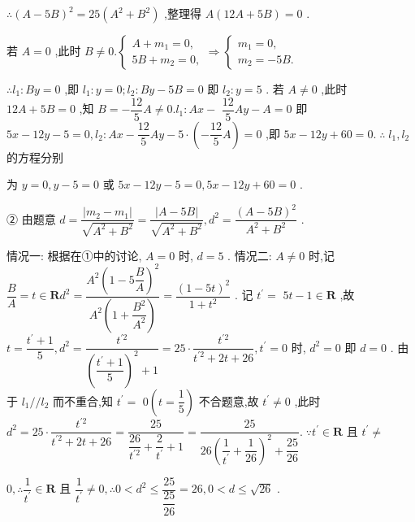 $\therefore {\left( A - 5B\right) }^{2} = {25}\left( {{A}^{2} + {B}^{2}}\right)$ ,整理得 $A\left( {{12A} + {5B}}\right)  = 0$ .

若 $A = 0$ ,此时 $B \neq  0.\left\{  {\begin{array}{l} A + {m}_{1} = 0, \\  {5B} + {m}_{2} = 0, \end{array} \Rightarrow  \left\{  \begin{array}{l} {m}_{1} = 0, \\  {m}_{2} =  - {5B}. \end{array}\right. }\right.$

$\therefore {l}_{1} : {By} = 0$ ,即 ${l}_{1} : y = 0;{l}_{2} : {By} - {5B} = 0$ 即 ${l}_{2} : y = 5$ . 若 $A \neq  0$ ,此时 ${12A} + {5B} = 0$ ,知 $B =  - \dfrac{12}{5}A \neq  0.{l}_{1} : {Ax} -$  $\dfrac{12}{5}{Ay} - A = 0$ 即 ${5x} - {12y} - 5 = 0,{l}_{2} : {Ax} - \dfrac{12}{5}{Ay} - 5 \cdot  \left( {-\dfrac{12}{5}A}\right)  = 0$ ,即 ${5x} - {12y} + {60} = 0.\;\therefore \;{l}_{1},{l}_{2}$ 的方程分别

为 $y = 0,y - 5 = 0$ 或 ${5x} - {12y} - 5 = 0,{5x} - {12y} + {60} = 0$ .

② 由题意 $d = \dfrac{\left| {m}_{2} - {m}_{1}\right| }{\sqrt{{A}^{2} + {B}^{2}}} = \dfrac{\left| A - 5B\right| }{\sqrt{{A}^{2} + {B}^{2}}},{d}^{2} = \dfrac{{\left( A - 5B\right) }^{2}}{{A}^{2} + {B}^{2}}$ .

情况一: 根据在①中的讨论, $A = 0$ 时, $d = 5$ . 情况二: $A \neq  0$ 时,记 $\dfrac{B}{A} = t \in  \mathbf{R}{d}^{2} = \dfrac{{A}^{2}{\left( 1 - 5\dfrac{B}{A}\right) }^{2}}{{A}^{2}\left( {1 + \dfrac{{B}^{2}}{{A}^{2}}}\right) } = \dfrac{{\left( 1 - 5t\right) }^{2}}{1 + {t}^{2}}$ . 记 ${t}^{\prime } =$  ${5t} - 1 \in  \mathbf{R}$ ,故 $t = \dfrac{{t}^{\prime } + 1}{5},{d}^{2} = \dfrac{{t}^{\prime 2}}{{\left( \dfrac{{t}^{\prime } + 1}{5}\right) }^{2} + 1} = {25} \cdot  \dfrac{{t}^{\prime 2}}{{t}^{\prime 2} + {2t} + {26}},{t}^{\prime } = 0$ 时, ${d}^{2} = 0$ 即 $d = 0$ . 由于 ${l}_{1}//{l}_{2}$ 而不重合,知 ${t}^{\prime } =$  $0\left( {t = \dfrac{1}{5}}\right)$ 不合题意,故 ${t}^{\prime } \neq  0$ ,此时 ${d}^{2} = {25} \cdot  \dfrac{{t}^{\prime 2}}{{t}^{\prime 2} + {2t} + {26}} = \dfrac{25}{\dfrac{26}{{t}^{\prime 2}} + \dfrac{2}{{t}^{\prime }} + 1} = \dfrac{25}{{26}{\left( \dfrac{1}{{t}^{\prime }} + \dfrac{1}{26}\right) }^{2} + \dfrac{25}{26}}.\;\because {t}^{\prime } \in  \mathbf{R}$ 且 ${t}^{\prime } \neq$

$0,\therefore \dfrac{1}{{t}^{\prime }} \in  \mathbf{R}$ 且 $\dfrac{1}{{t}^{\prime }} \neq  0,\therefore 0 < {d}^{2} \leq  \dfrac{25}{\dfrac{25}{26}} = {26},0 < d \leq  \sqrt{26}$ .


